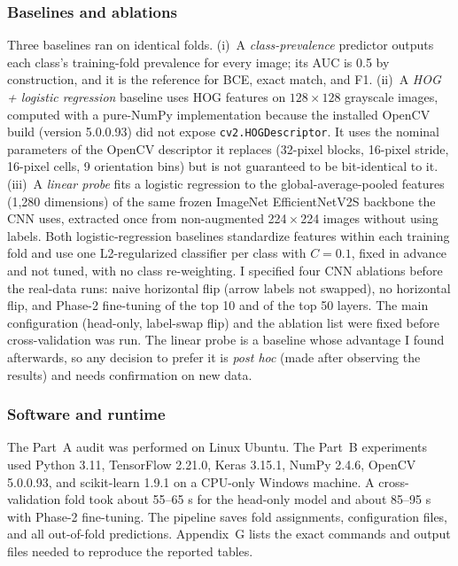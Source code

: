 \documentclass[11pt]{article}
\begin{document}
\subsubsection*{Baselines and ablations}
Three baselines ran on identical folds. (i)~A \emph{class-prevalence} predictor outputs each class's training-fold prevalence for every image; its AUC is 0.5 by construction, and it is the reference for BCE, exact match, and F1. (ii)~A \emph{HOG + logistic regression} baseline uses HOG features on $128\times128$ grayscale images, computed with a pure-NumPy implementation because the installed OpenCV build (version 5.0.0.93) did not expose \texttt{cv2.HOGDescriptor}. It uses the nominal parameters of the OpenCV descriptor it replaces (32-pixel blocks, 16-pixel stride, 16-pixel cells, 9 orientation bins) but is not guaranteed to be bit-identical to it. (iii)~A \emph{linear probe} fits a logistic regression to the global-average-pooled features (1,280 dimensions) of the same frozen ImageNet EfficientNetV2S backbone the CNN uses, extracted once from non-augmented 224\,$\times$\,224 images without using labels. Both logistic-regression baselines standardize features within each training fold and use one L2-regularized classifier per class with $C=0.1$, fixed in advance and not tuned, with no class re-weighting. I specified four CNN ablations before the real-data runs: naive horizontal flip (arrow labels not swapped), no horizontal flip, and Phase-2 fine-tuning of the top 10 and of the top 50 layers. The main configuration (head-only, label-swap flip) and the ablation list were fixed before cross-validation was run. The linear probe is a baseline whose advantage I found afterwards, so any decision to prefer it is \emph{post hoc} (made after observing the results) and needs confirmation on new data.

\subsubsection*{Software and runtime}
The Part~A audit was performed on Linux Ubuntu. The Part~B experiments used Python 3.11, TensorFlow 2.21.0, Keras 3.15.1, NumPy 2.4.6, OpenCV 5.0.0.93, and scikit-learn 1.9.1 on a CPU-only Windows machine. A cross-validation fold took about 55--65 s for the head-only model and about 85--95 s with Phase-2 fine-tuning. The pipeline saves fold assignments, configuration files, and all out-of-fold predictions. Appendix~G lists the exact commands and output files needed to reproduce the reported tables.
\end{document}
